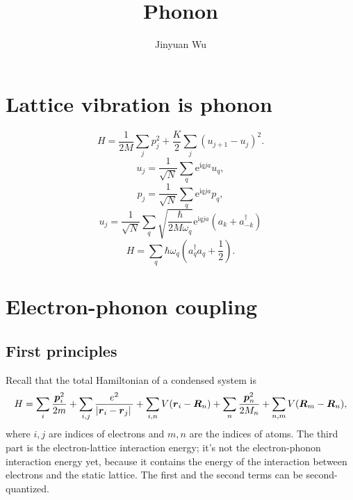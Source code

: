 \documentclass[hyperref, a4paper]{article}
\title{Phonon}
\author{Jinyuan Wu}
\newcommand*{\ii}{\mathrm{i}}
\newcommand*{\ee}{\mathrm{e}}
\begin{document}
\maketitle

\section{Lattice vibration is phonon}

\begin{equation}
    H = \frac{1}{2M} \sum_{j} {p}_j^2 + \frac{K}{2} \sum_{j} ({u}_{j+1} - {u}_j)^2.
\end{equation}
\begin{equation}
    {u}_j = \frac{1}{\sqrt{N}} \sum_q \ee^{\ii q j a} {u}_q,
\end{equation}
\begin{equation}
    {p}_j = \frac{1}{\sqrt{N}} \sum_q \ee^{\ii q j a} {p}_q,
\end{equation}
\begin{equation}
    u_j = \frac{1}{\sqrt{N}} \sum_q \sqrt{\frac{\hbar}{2 M \omega_q}} \ee^{\ii q j a}
    (a_k + a_{-k}^\dagger)
\end{equation}
\begin{equation}
    H = \sum_q \hbar \omega_q \left(
        a^\dagger_q a_q + \frac{1}{2}
    \right).
\end{equation}

\section{Electron-phonon coupling}

\subsection{First principles}

Recall that the total Hamiltonian of a condensed system is 
\begin{equation}
    H = \sum_{i} \frac{\vb*{p}_i^2}{2m} 
    + \sum_{i, j} \frac{e^2}{\abs*{\vb*{r}_i - \vb*{r}_j}}
    + \sum_{i, n} V(\vb*{r}_i - \vb*{R}_n)
    + \sum_{n} \frac{\vb*{p}_n^2}{2M_n}
    + \sum_{n, m} V(\vb*{R}_m - \vb*{R}_n),
\end{equation} 
where $i, j$ are indices of electrons 
and $m, n$ are the indices of atoms. 
The third part is the electron-lattice interaction energy; 
it's not the electron-phonon interaction energy yet, 
because it contains the energy of the interaction 
between electrons and the static lattice. 
The first and the second terms can be second-quantized.
\end{document}
